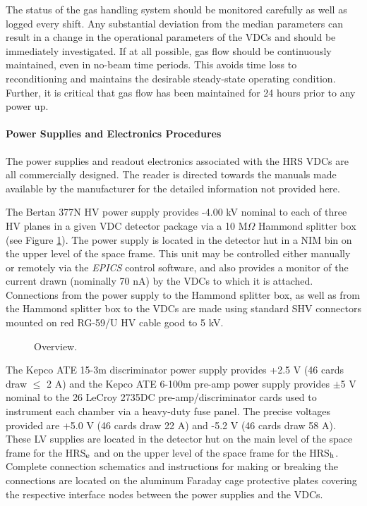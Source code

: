 \documentclass[12pt]{article}
\begin{document}
The status of the gas handling system should be monitored carefully
as well as logged every shift.  Any substantial deviation from the
median parameters can result in a change in the operational parameters
of the VDCs and should be immediately investigated.  If at all
possible, gas flow should be continuously maintained, even in
no-beam time periods.   This avoids time loss to reconditioning and
maintains the desirable steady-state operating condition.  Further,
it is critical that gas flow has been maintained for 24 hours prior
to any power up.

\paragraph{Power Supplies and Electronics Procedures}
\label{lv}

The power supplies and readout electronics associated with the HRS
VDCs are all commercially designed.  The reader is directed towards
the manuals made available by the manufacturer for the detailed
information not provided here.

The Bertan 377N HV power supply provides -4.00 kV nominal to
each of three HV planes in a given VDC detector package via a
10 M$\Omega$ Hammond splitter box (see Figure \ref{vdcscheme}).
The power supply is located in
the detector hut in a NIM bin on the upper level of the space frame.
This unit may be controlled either manually or remotely via the
{\it EPICS} control software, and also provides a monitor of the
current drawn (nominally 70 nA) by the VDCs to which it is attached.
Connections from the power supply to the Hammond splitter box, as
well as from the Hammond splitter box to the VDCs are made using
standard SHV connectors mounted on red RG-59/U HV cable good to 5 kV.

\begin{figure}[H]
\setlength{\epsfxsize}{1.00\textwidth}
\setlength{\epsfysize}{0.90\textwidth}
\leavevmode
{}
\caption{Overview.}
\label{vdcscheme}
\end{figure}

The Kepco ATE 15-3m discriminator power supply provides +2.5 V (46 cards
draw $\leq$ 2 A)
and the Kepco ATE 6-100m pre-amp power supply provides $\pm$5 V nominal
to the 26 LeCroy 2735DC pre-amp/discriminator cards used to instrument 
each chamber via a heavy-duty fuse panel.  The precise voltages provided
are +5.0 V (46 cards draw 22 A) and -5.2 V (46 cards draw 58 A).  These
LV supplies are
located in the detector hut on the main level
of the space frame for the HRS$_{\rm e}$ and on the upper level of the
space frame for the HRS$_{\rm h}$.
Complete connection schematics and instructions
for making or breaking the connections are located on the aluminum
Faraday cage protective plates covering the respective interface
nodes between the power supplies and the VDCs.
\end{document}
